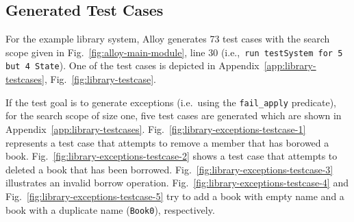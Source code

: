 \subsection{Generated Test Cases}
\label{sec:alloy-test-cases}
For the example library system, Alloy generates 73 test cases with the search scope given in Fig.~\ref{fig:alloy-main-module}, line 30 (i.e.,~\texttt{run testSystem for 5 but 4 State}). One of the test cases is depicted in Appendix~\ref{app:library-testcases}, Fig.~\ref{fig:library-testcase}. 

If the test goal is to generate exceptions (i.e.\ using the \texttt{fail\_apply} predicate), for the search scope of size one, five test cases are generated which are shown in Appendix~\ref{app:library-testcases}. Fig.~\ref{fig:library-exceptions-testcase-1} represents a test case that attempts to remove a member that has borowed a book. Fig.~\ref{fig:library-exceptions-testcase-2} shows a test case that attempts to deleted a book that has been borrowed. Fig.~\ref{fig:library-exceptions-testcase-3} illustrates an invalid borrow operation. Fig.~\ref{fig:library-exceptions-testcase-4} and Fig.~\ref{fig:library-exceptions-testcase-5} try to add a book with empty name and a book with a duplicate name (\texttt{Book0}), respectively.